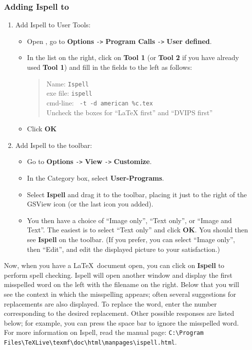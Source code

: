 \documentclass{article}
\begin{document}
\subsubsection{Adding Ispell to }
\label{winshell:ispell}
\begin{enumerate}
\item Add Ispell to User Tools:
\begin{itemize}
\item Open , go to \textbf{Options} \verb+->+ 
\textbf{Program Calls} \verb+->+ \textbf{User defined}.
\item In the list on the right, click on \textbf{Tool 1} (or \textbf{Tool
    2} if you have already used \textbf{Tool 1}) and fill in the 
fields to the left as follows:\vspace{-6pt}
\begin{quote}
Name: \verb+Ispell+\\
exe file: \verb+ispell+\\
cmd-line: \verb+ -t -d american %c.tex+\\
Uncheck the boxes for ``LaTeX first'' and ``DVIPS first''
\end{quote}%
\item Click \textbf{OK}
\end{itemize}

\item Add Ispell to the toolbar: %
\begin{itemize}\itemsep 0pt
\item Go to  \textbf{Options} \verb+->+ \textbf{View} \verb+->+ \textbf{Customize}.
\item In the Category box, select \textbf{User-Programs}.
\item Select \textbf{Ispell} and drag it to the toolbar, placing it just to
  the right of the GSView icon (or the last icon you added).
\item You then have a choice of ``Image only'', ``Text only'', or ``Image and
Text''. The easiest is to select ``Text only'' and click \textbf{OK}.
You should then see \textbf{Ispell} on the toolbar. (If you prefer, you can
select ``Image only'', then ``Edit'', and edit the displayed picture to your
satisfaction.)
\end{itemize}
\end{enumerate}
Now, when you have a \LaTeX\ document open, you can click on
\textbf{Ispell} to perform spell checking. Ispell will open another window
and display the first misspelled word on the left with the filename on the
right. Below that you will see the context in which the misspelling appears;
often several suggestions for replacements are also displayed. To replace
the word, enter the number corresponding to the desired replacement. Other
possible responses are listed below; for example, you can press the space
bar to ignore the misspelled word. For more information on Ispell, read the
manual page: \verb+C:\Program Files\TeXLive\texmf\doc\html\manpages\ispell.html+.
\end{document}
